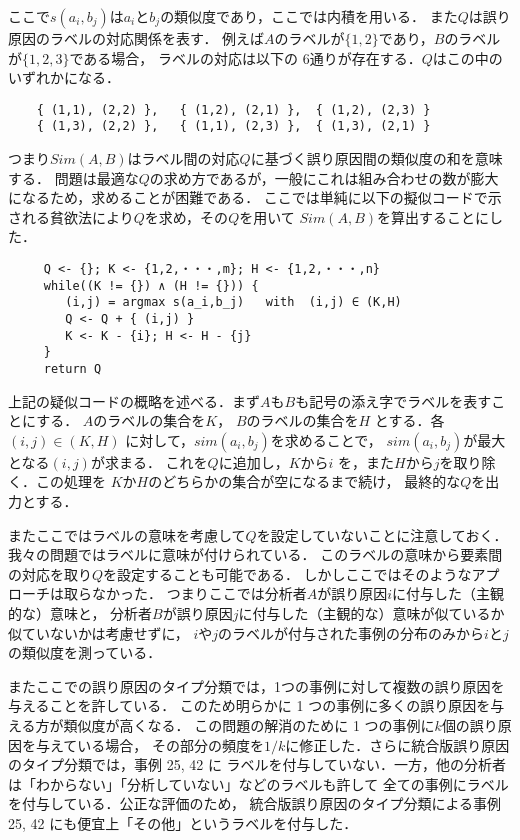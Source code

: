 \documentclass[japanese]{jnlp_1.4}
\begin{document}
ここで$s(a_i,b_j)$は$a_i$と$b_j$の類似度であり，ここでは内積を用いる．
また$Q$は誤り原因のラベルの対応関係を表す．
例えば$A$のラベルが$\{1,2\}$であり，$B$のラベルが$\{1,2,3\}$である場合，
ラベルの対応は以下の 6通りが存在する．$Q$はこの中のいずれかになる．

\begin{verbatim}
    { (1,1), (2,2) },   { (1,2), (2,1) },  { (1,2), (2,3) }
    { (1,3), (2,2) },   { (1,1), (2,3) },  { (1,3), (2,1) }
\end{verbatim}

つまり$Sim(A,B)$はラベル間の対応$Q$に基づく誤り原因間の類似度の和を意味する．
問題は最適な$Q$の求め方であるが，一般にこれは組み合わせの数が膨大になるため，求めることが困難である．
ここでは単純に以下の擬似コードで示される貧欲法により$Q$を求め，その$Q$を用いて
$Sim(A,B)$を算出することにした．

\vspace{0.5\Cvs}
\begin{screen}
\small
\begin{verbatim}
     Q <- {}; K <- {1,2,・・・,m}; H <- {1,2,・・・,n}
     while((K != {}) ∧ (H != {})) {
        (i,j) = argmax s(a_i,b_j)   with  (i,j) ∈ (K,H)
        Q <- Q + { (i,j) }
        K <- K - {i}; H <- H - {j} 
     }
     return Q
\end{verbatim}
\end{screen}
\vspace{0.5\Cvs}

上記の疑似コードの概略を述べる．まず$A$も$B$も記号の添え字でラベルを表すことにする．
$A$のラベルの集合を$K$，
$B$のラベルの集合を$H$
とする．各$(i,j) \in (K,H)$
に対して，$sim(a_i,b_j)$を求めることで，
$sim(a_i,b_j)$が最大となる$(i,j)$が求まる．
これを$Q$に追加し，$K$から$i$
を，また$H$から$j$を取り除く．この処理を
$K$か$H$のどちらかの集合が空になるまで続け，
最終的な$Q$を出力とする．

またここではラベルの意味を考慮して$Q$を設定していないことに注意しておく．
我々の問題ではラベルに意味が付けられている．
このラベルの意味から要素間の対応を取り$Q$を設定することも可能である．
しかしここではそのようなアプローチは取らなかった．
つまりここでは分析者$A$が誤り原因$i$に付与した（主観的な）意味と，
分析者$B$が誤り原因$j$に付与した（主観的な）意味が似ているか似ていないかは考慮せずに，
$i$や$j$のラベルが付与された事例の分布のみから$i$と$j$の類似度を測っている．

またここでの誤り原因のタイプ分類では，1つの事例に対して複数の誤り原因を与えることを許している．
このため明らかに 1 つの事例に多くの誤り原因を与える方が類似度が高くなる．
この問題の解消のために 1 つの事例に$k$個の誤り原因を与えている場合，
その部分の頻度を$1/k$に修正した．さらに統合版誤り原因のタイプ分類では，事例 25, 42 に
ラベルを付与していない．一方，他の分析者は「わからない」「分析していない」などのラベルも許して
全ての事例にラベルを付与している．公正な評価のため，
統合版誤り原因のタイプ分類による事例 25, 42 にも便宜上「その他」というラベルを付与した．
\end{document}
